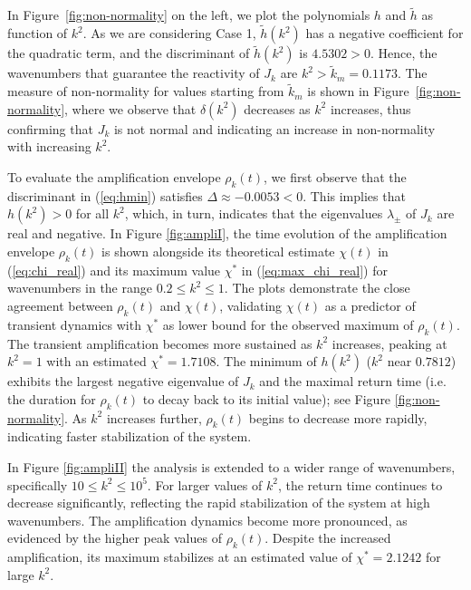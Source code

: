 \documentclass{article}
\newcommand{\jac}{J_{k}}
\begin{document}
In Figure~\ref{fig:non-normality} on the left, we plot the polynomials $h$ and $\tilde h$ as function of $k^2$. As we are considering Case 1, $\tilde h(k^2)$ has a negative coefficient for the quadratic term, and the discriminant of $\tilde h(k^2)$ is $4.5302 > 0$. Hence, the wavenumbers that guarantee the reactivity of $\jac$ are $k^2 > \tilde k_m = 0.1173$. The measure of non-normality for values starting from $\tilde k_m$ is shown in Figure~\ref{fig:non-normality}, where we observe that $\delta(k^2)$ decreases as $k^2$ increases, thus confirming that $\jac$ is not normal and indicating an increase in non-normality with increasing $k^2$. 

 To evaluate the amplification envelope $\rho_{k}(t)$, we first observe that the discriminant in (\ref{eq:hmin}) satisfies $\Delta \approx -0.0053 < 0$. This implies that $h(k^2) > 0$ for all $k^2$, which, in turn, indicates that the eigenvalues $\lambda_{\pm}$ of $\jac$ are real and negative. In Figure \ref{fig:ampliI},
the time evolution of the amplification envelope $\rho_{k}(t)$ is shown alongside its theoretical estimate $\chi(t)$ in (\ref{eq:chi_real}) and its maximum value $\chi^*$ in (\ref{eq:max_chi_real}) for wavenumbers in the range $0.2 \leq k^2 \leq 1$. The plots demonstrate the close agreement between $\rho_{k}(t)$ and $\chi(t)$, validating $\chi(t)$ as a predictor of transient dynamics with $\chi^*$ as lower bound for the observed maximum of $\rho_{k}(t)$. The transient amplification becomes more sustained as $k^2$ increases, peaking at $k^2=1$ with an estimated $\chi^* = 1.7108$. The minimum of $h(k^2)$ ($k^2$ near $0.7812$) exhibits the largest negative eigenvalue of $\jac$ and the maximal return time (i.e. the duration for $\rho_{k}(t)$ to decay back to its initial value); see Figure \ref{fig:non-normality}. As $k^2$ increases further, $\rho_{k}(t)$ begins to decrease more rapidly, indicating faster stabilization of the system.

 In Figure \ref{fig:ampliII} the analysis is extended to a wider range of wavenumbers, specifically $10 \leq k^2 \leq 10^5$. For larger values of $k^2$, the return time continues to decrease significantly, reflecting the rapid stabilization of the system at high wavenumbers. The amplification dynamics become more pronounced, as evidenced by the higher peak values of $\rho_{k}(t)$. Despite the increased amplification, its maximum stabilizes at an estimated value of $\chi^* = 2.1242$ for large $k^2$.
\end{document}
